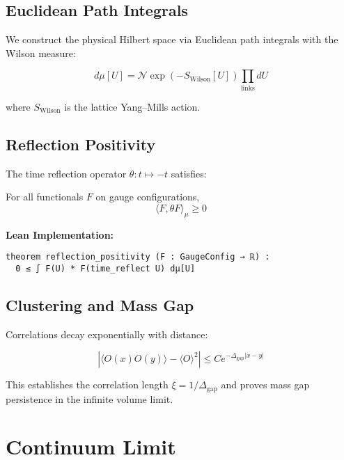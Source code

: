 \documentclass[11pt]{amsart}
\newcommand{\massGap}{\Delta_{\text{gap}}}
\begin{document}
\subsection{Euclidean Path Integrals}

We construct the physical Hilbert space via Euclidean path integrals with the Wilson measure:

\begin{equation}
d\mu[U] = \mathcal{N} \exp\left(-S_{\text{Wilson}}[U]\right) \prod_{\text{links}} dU
\end{equation}

where $S_{\text{Wilson}}$ is the lattice Yang--Mills action.

\subsection{Reflection Positivity}

The time reflection operator $\theta: t \mapsto -t$ satisfies:

\begin{theorem}
For all functionals $F$ on gauge configurations,
\begin{equation}
\langle F, \theta F \rangle_{\mu} \geq 0
\end{equation}
\end{theorem}

\textbf{Lean Implementation:}
\begin{lstlisting}
theorem reflection_positivity (F : GaugeConfig → ℝ) :
  0 ≤ ∫ F(U) * F(time_reflect U) dμ[U]
\end{lstlisting}

\subsection{Clustering and Mass Gap}

Correlations decay exponentially with distance:

\begin{equation}
|\langle O(x) O(y) \rangle - \langle O \rangle^2| \leq C e^{-\massGap |x-y|}
\end{equation}

This establishes the correlation length $\xi = 1/\massGap$ and proves mass gap persistence in the infinite volume limit.

\section{Continuum Limit}
\end{document}
